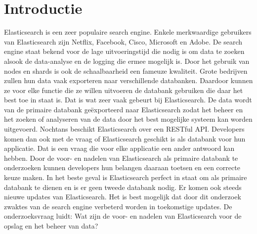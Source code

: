 \documentclass[fleqn,10pt]{voorstel}
\affiliation{\textbf{Contact:}
	\textsuperscript{3} \href{mailto:ruben.standaert.w1083@student.hogent.be}{ruben.standaert.w1083@student.hogent.be}}
\begin{document}
	
	\flushbottom %
	\maketitle %
	\tableofcontents %
	\thispagestyle{empty} %
	
	
	
	\section{Introductie} %
	\label{sec:introductie}
	
	Elasticsearch is een zeer populaire search engine. Enkele merkwaardige gebruikers van Elasticsearch zijn Netflix, Facebook, Cisco, Microsoft en Adobe. De search engine staat bekend voor de lage uitvoeringstijd die nodig is om data te zoeken alsook de data-analyse en de logging die ermee mogelijk is. Door het gebruik van nodes en shards is ook de schaalbaarheid een fameuze kwaliteit.
	Grote bedrijven zullen hun data vaak exporteren naar verschillende databanken. Daardoor kunnen ze voor elke functie die ze willen uitvoeren de databank gebruiken die daar het best toe in staat is. Dat is wat zeer vaak gebeurt bij Elasticsearch. De data wordt van de primaire databank geëxporteerd naar Elasticsearch zodat het beheer en het zoeken of analyseren van de data door het best mogelijke systeem kan worden uitgevoerd. Nochtans beschikt Elasticsearch over een RESTful API. Developers komen dan ook met de vraag of Elasticsearch geschikt is als databank voor hun applicatie. Dat is een vraag die voor elke applicatie een ander antwoord kan hebben. Door de voor- en nadelen van Elasticsearch als primaire databank te onderzoeken kunnen developers hun belangen daaraan toetsen en een correcte keuze maken. In het beste geval is Elasticsearch perfect in staat om als primaire databank te dienen en is er geen tweede databank nodig. Er komen ook steeds nieuwe updates van Elasticsearch. Het is best mogelijk dat door dit onderzoek zwaktes van de search engine verbeterd worden in toekomstige updates. De onderzoeksvraag luidt: Wat zijn de voor- en nadelen van Elasticsearch voor de opslag en het beheer van data?
	
\end{document}
